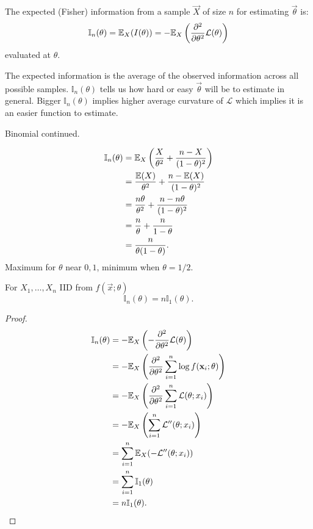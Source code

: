 \documentclass[10pt, a4paper]{article}
\begin{document}
\begin{definition}
    The expected
    (Fisher)
    information from a sample $\vec{X}$ of size $n$ for estimating $\vec{\theta}$ is:
    \[
    \mathbb{I}_n(\theta) = \mathbb{E}_{X}(I(\theta)) = -\mathbb{E}_X\left(\frac{\partial ^ 2}{\partial \theta ^ 2}\mathcal{L}(\theta)\right)
    \]
    evaluated at $\theta$.

\end{definition}

The expected information is the average of the observed information across all possible samples.
$\mathbb{I}_n(\theta)$ tells us how hard or easy $\vec{\theta}$ will be to estimate in general.
Bigger $\mathbb{I}_n(\theta)$ implies higher average curvature of $\mathcal{L}$ which implies it is an easier function to estimate.

\begin{example}
    Binomial continued.

    \begin{align*}
        \mathbb{I}_n(\theta) &= \mathbb{E}_{X}\left(\frac{X}{\theta ^ 2} + \frac{n - X}{(1 - \theta) ^ 2}\right)  \\
        &= \frac{\mathbb{E}(X)}{\theta ^ 2} + \frac{n - \mathbb{E}(X)}{(1 - \theta) ^ 2} \\
        &= \frac{n\theta}{\theta ^ 2} + \frac{n - n\theta}{(1 - \theta) ^ 2} \\
        &= \frac{n}{\theta} + \frac{n}{1 - \theta} \\
        &= \frac{n}{\theta(1 - \theta)}.
    \end{align*}
    Maximum for $\theta$ near $0, 1$,
    minimum when $\theta = 1 / 2$.
\end{example}

\begin{proposition}
    For $X_1, \dotsc, X_n$ IID from $f(\vec{x}; \theta)$
    \[
    \mathbb{I}_n(\theta) = n\mathbb{I}_1(\theta).
    \]

    \begin{proof}
        \begin{align*}
            \mathbb{I}_n(\mathbf{\theta}) &= -\mathbb{E}_{X}\left(-\frac{\partial ^ 2}{\partial \theta ^ 2}\mathcal{L}(\theta)\right) \\
            &= -\mathbb{E}_{X}\left(\frac{\partial ^ 2}{\partial \theta ^ 2}\sum_{i = 1}^{n}\log{f(\mathbf{x}_i; \theta)}\right) \\
            &= -\mathbb{E}_{X}\left(\frac{\partial ^ 2}{\partial\theta ^ 2}\sum_{i = 1}^{n}\mathcal{L}(\theta; x_i)\right) \\
            &= -\mathbb{E}_{X}\left(\sum_{i = 1}^{n}\mathcal{L}''(\theta; x_i)\right) \\
            &= \sum_{i = 1}^{n}\mathbb{E}_{X}(-\mathcal{L}''(\theta; x_i)) \\
            &= \sum_{i = 1}^{n}\mathbb{I}_1(\mathbf{\theta}) \\
            &= n\mathbb{I}_{1}(\mathbf{\theta}).
        \end{align*}
    \end{proof}
\end{proposition}
\end{document}
